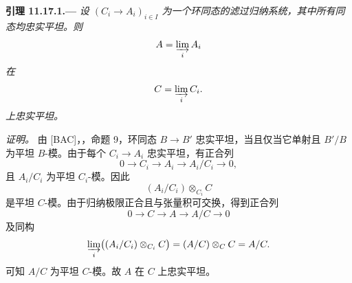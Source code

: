 \medskip
{}\label{lem:sga3-VIB-11.17.1}%
\noindent\textbf{引理 11.17.1.---}
\emph{设 \((C_i\to A_i)_{i\in I}\) 为一个环同态的滤过归纳系统，其中所有同态均忠实平坦。则}
\[
  A=\varinjlim_i A_i
\]
\emph{在}
\[
  C=\varinjlim_i C_i.
\]
\emph{上忠实平坦。}

\emph{证明。}
由 \textup{[BAC]}，，命题 9，环同态 \(B\to B'\) 忠实平坦，当且仅当它单射且 \(B'/B\) 为平坦 \(B\)-模。由于每个 \(C_i\to A_i\) 忠实平坦，有正合列
\label{seq:sga3-VIB-11.17.1-stage}%
\[
  0\longrightarrow C_i\longrightarrow A_i
   \longrightarrow A_i/C_i\longrightarrow0,
\]
且 \(A_i/C_i\) 为平坦 \(C_i\)-模。因此
\[
  (A_i/C_i)\otimes_{C_i}C
\]
是平坦 \(C\)-模。由于归纳极限正合且与张量积可交换，得到正合列
\label{seq:sga3-VIB-11.17.1-limit}%
\[
  0\longrightarrow C\longrightarrow A
   \longrightarrow A/C\longrightarrow0
\]
及同构
\label{form:sga3-VIB-11.17.1-limit-quotient}%
\[
  \varinjlim_i\bigl((A_i/C_i)\otimes_{C_i}C\bigr)
    =(A/C)\otimes_CC=A/C.
\]
可知 \(A/C\) 为平坦 \(C\)-模。故 \(A\) 在 \(C\) 上忠实平坦。

